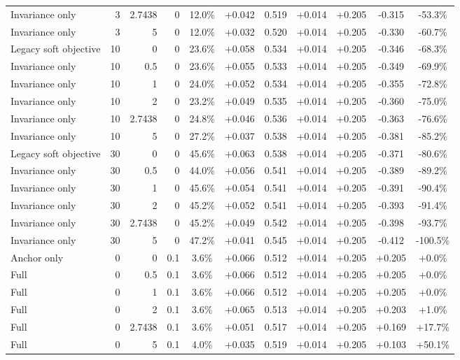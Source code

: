 \begin{table}[htbp]
\begin{tabular}{lrrrccccccc}
Invariance only & 3 & 2.7438 & 0 & 12.0\% & +0.042 & 0.519 & +0.014 & +0.205 & -0.315 & -53.3\% \\
Invariance only & 3 & 5 & 0 & 12.0\% & +0.032 & 0.520 & +0.014 & +0.205 & -0.330 & -60.7\% \\
Legacy soft objective & 10 & 0 & 0 & 23.6\% & +0.058 & 0.534 & +0.014 & +0.205 & -0.346 & -68.3\% \\
Invariance only & 10 & 0.5 & 0 & 23.6\% & +0.055 & 0.533 & +0.014 & +0.205 & -0.349 & -69.9\% \\
Invariance only & 10 & 1 & 0 & 24.0\% & +0.052 & 0.534 & +0.014 & +0.205 & -0.355 & -72.8\% \\
Invariance only & 10 & 2 & 0 & 23.2\% & +0.049 & 0.535 & +0.014 & +0.205 & -0.360 & -75.0\% \\
Invariance only & 10 & 2.7438 & 0 & 24.8\% & +0.046 & 0.536 & +0.014 & +0.205 & -0.363 & -76.6\% \\
Invariance only & 10 & 5 & 0 & 27.2\% & +0.037 & 0.538 & +0.014 & +0.205 & -0.381 & -85.2\% \\
Legacy soft objective & 30 & 0 & 0 & 45.6\% & +0.063 & 0.538 & +0.014 & +0.205 & -0.371 & -80.6\% \\
Invariance only & 30 & 0.5 & 0 & 44.0\% & +0.056 & 0.541 & +0.014 & +0.205 & -0.389 & -89.2\% \\
Invariance only & 30 & 1 & 0 & 45.6\% & +0.054 & 0.541 & +0.014 & +0.205 & -0.391 & -90.4\% \\
Invariance only & 30 & 2 & 0 & 45.2\% & +0.052 & 0.541 & +0.014 & +0.205 & -0.393 & -91.4\% \\
Invariance only & 30 & 2.7438 & 0 & 45.2\% & +0.049 & 0.542 & +0.014 & +0.205 & -0.398 & -93.7\% \\
Invariance only & 30 & 5 & 0 & 47.2\% & +0.041 & 0.545 & +0.014 & +0.205 & -0.412 & -100.5\% \\
Anchor only & 0 & 0 & 0.1 & 3.6\% & +0.066 & 0.512 & +0.014 & +0.205 & +0.205 & +0.0\% \\
Full & 0 & 0.5 & 0.1 & 3.6\% & +0.066 & 0.512 & +0.014 & +0.205 & +0.205 & +0.0\% \\
Full & 0 & 1 & 0.1 & 3.6\% & +0.066 & 0.512 & +0.014 & +0.205 & +0.205 & +0.0\% \\
Full & 0 & 2 & 0.1 & 3.6\% & +0.065 & 0.513 & +0.014 & +0.205 & +0.203 & +1.0\% \\
Full & 0 & 2.7438 & 0.1 & 3.6\% & +0.051 & 0.517 & +0.014 & +0.205 & +0.169 & +17.7\% \\
Full & 0 & 5 & 0.1 & 4.0\% & +0.035 & 0.519 & +0.014 & +0.205 & +0.103 & +50.1\% \\

\end{tabular}
\end{table}
